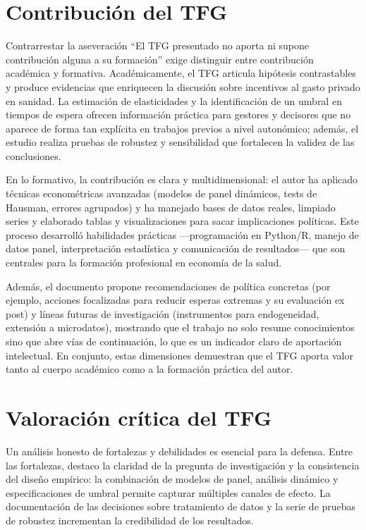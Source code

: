 \section{Contribución del TFG}

Contrarrestar la aseveración “El TFG presentado no aporta ni supone contribución
alguna a su formación” exige distinguir entre contribución académica y formativa.
Académicamente, el TFG articula hipótesis contrastables y produce evidencias que
enriquecen la discusión sobre incentivos al gasto privado en sanidad. La estimación
de elasticidades y la identificación de un umbral en tiempos de espera ofrecen
información práctica para gestores y decisores que no aparece de forma tan
explícita en trabajos previos a nivel autonómico; además, el estudio realiza
pruebas de robustez y sensibilidad que fortalecen la validez de las conclusiones.

En lo formativo, la contribución es clara y multidimensional: el autor ha
aplicado técnicas econométricas avanzadas (modelos de panel dinámicos, tests de
Hausman, errores agrupados) y ha manejado bases de datos reales, limpiado series
y elaborado tablas y visualizaciones para sacar implicaciones políticas. Este
proceso desarrolló habilidades prácticas —programación en Python/R, manejo de
datos panel, interpretación estadística y comunicación de resultados— que son
centrales para la formación profesional en economía de la salud.

Además, el documento propone recomendaciones de política concretas (por
ejemplo, acciones focalizadas para reducir esperas extremas y su evaluación
ex post) y líneas futuras de investigación (instrumentos para endogeneidad,
extensión a microdatos), mostrando que el trabajo no solo resume conocimientos
sino que abre vías de continuación, lo que es un indicador claro de aportación
intelectual. En conjunto, estas dimensiones demuestran que el TFG aporta valor
tanto al cuerpo académico como a la formación práctica del autor.

\section{Valoración crítica del TFG}

Un análisis honesto de fortalezas y debilidades es esencial para la defensa.
Entre las fortalezas, destaco la claridad de la pregunta de investigación y la
consistencia del diseño empírico: la combinación de modelos de panel, análisis
dinámico y especificaciones de umbral permite capturar múltiples canales de
efecto. La documentación de las decisiones sobre tratamiento de datos y la
serie de pruebas de robustez incrementan la credibilidad de los resultados.

